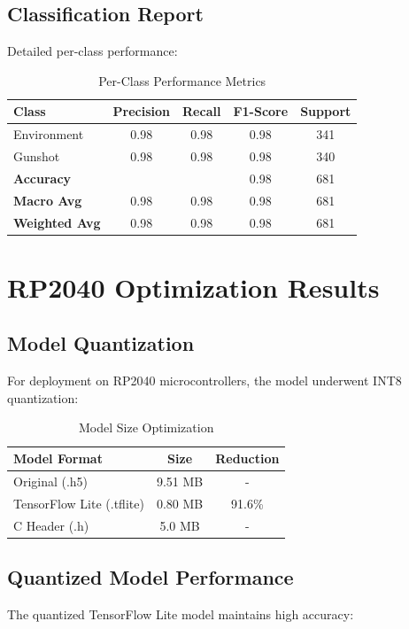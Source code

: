 \documentclass[12pt]{article}
\begin{document}
\subsection{Classification Report}
Detailed per-class performance:

\begin{table}[H]
\centering
\caption{Per-Class Performance Metrics}
\begin{tabular}{@{}lcccc@{}}
\toprule
\textbf{Class} & \textbf{Precision} & \textbf{Recall} & \textbf{F1-Score} & \textbf{Support} \\
\midrule
Environment & 0.98 & 0.98 & 0.98 & 341 \\
Gunshot & 0.98 & 0.98 & 0.98 & 340 \\
\midrule
\textbf{Accuracy} & & & 0.98 & 681 \\
\textbf{Macro Avg} & 0.98 & 0.98 & 0.98 & 681 \\
\textbf{Weighted Avg} & 0.98 & 0.98 & 0.98 & 681 \\
\bottomrule
\end{tabular}
\end{table}

\section{RP2040 Optimization Results}

\subsection{Model Quantization}
For deployment on RP2040 microcontrollers, the model underwent INT8 quantization:

\begin{table}[H]
\centering
\caption{Model Size Optimization}
\begin{tabular}{@{}lcc@{}}
\toprule
\textbf{Model Format} & \textbf{Size} & \textbf{Reduction} \\
\midrule
Original (.h5) & 9.51 MB & - \\
TensorFlow Lite (.tflite) & 0.80 MB & 91.6\% \\
C Header (.h) & 5.0 MB & - \\
\bottomrule
\end{tabular}
\end{table}

\subsection{Quantized Model Performance}
The quantized TensorFlow Lite model maintains high accuracy:
\end{document}
